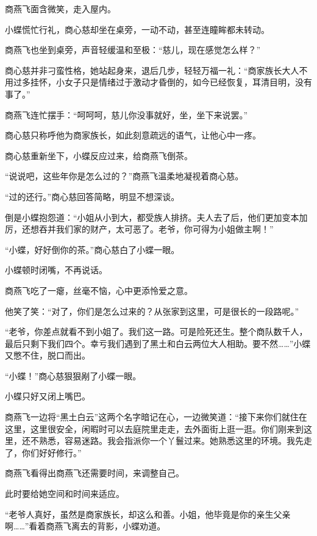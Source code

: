 
\begin{this_body}



商燕飞面含微笑，走入屋内。

小蝶慌忙行礼，商心慈却坐在桌旁，一动不动，甚至连瞳眸都未转动。

商燕飞也坐到桌旁，声音轻缓温和至极：“慈儿，现在感觉怎么样？”

商心慈并非刁蛮性格，她站起身来，退后几步，轻轻万福一礼：“商家族长大人不用过多挂怀，小女子只是情绪过于激动才昏倒的，如今已经恢复，耳清目明，没有事了。”

商燕飞连忙摆手：“呵呵呵，慈儿你没事就好，坐，坐下来说罢。”

商心慈只称呼他为商家族长，如此刻意疏远的语气，让他心中一疼。

商心慈重新坐下，小蝶反应过来，给商燕飞倒茶。

“说说吧，这些年你是怎么过的？”商燕飞温柔地凝视着商心慈。

“过的还行。”商心慈回答简略，明显不想深谈。

倒是小蝶抱怨道：“小姐从小到大，都受族人排挤。夫人去了后，他们更加变本加厉，还想吞并我们家的财产，太可恶了。老爷，你可得为小姐做主啊！”

“小蝶，好好倒你的茶。”商心慈白了小蝶一眼。

小蝶顿时闭嘴，不再说话。

商燕飞吃了一瘪，丝毫不恼，心中更添怜爱之意。

他笑了笑：“对了，你们是怎么过来的？从张家到这里，可是很长的一段路呢。”

“老爷，你差点就看不到小姐了。我们这一路。可是险死还生。整个商队数千人，最后只剩下我们四个。幸亏我们遇到了黑土和白云两位大人相助。要不然……”小蝶又憋不住，脱口而出。

“小蝶！”商心慈狠狠剐了小蝶一眼。

小蝶只好又闭上嘴巴。

商燕飞一边将“黑土白云”这两个名字暗记在心，一边微笑道：“接下来你们就住在这里，这里很安全，闲暇时可以去庭院里走走，去外面街上逛一逛。你们刚来到这里，还不熟悉，容易迷路。我会指派你一个丫鬟过来。她熟悉这里的环境。我先走了，你们好好修行。”

商燕飞看得出商燕飞还需要时间，来调整自己。

此时要给她空间和时间来适应。

“老爷人真好，虽然是商家族长，却这么和善。小姐，他毕竟是你的亲生父亲啊……”看着商燕飞离去的背影，小蝶劝道。


\end{this_body}
